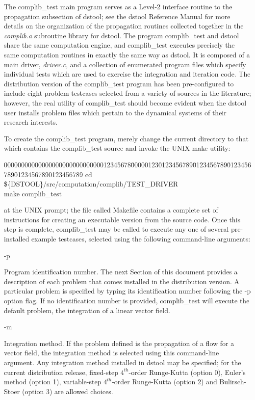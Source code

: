 \noindent The complib\_test main program serves as a Level-2 interface routine to the propagation 
subsection of dstool;  see the dstool Reference Manual \cite{ref1} for more details on the organization
of the propagation routines collected together in the {\em complib.a} subroutine library for dstool.
The program complib\_test and dstool share the same computation engine, and
complib\_test executes precisely the same computation routines in exactly the same way as dstool.
It is composed of a main driver, {\em driver.c}, and a collection
of enumerated program files which specify individual tests which are used to exercise the integration
and iteration code. 
The distribution version of the complib\_test program has been pre-configured to include
eight problem testcases selected from a variety of sources in the literature;   however,
the real utility of complib\_test should become evident when the dstool user installs problem
files which pertain to the dynamical systems of their research interests.
\medskip

\noindent To create the complib\_test program, merely change the current directory to that which contains
the complib\_test source and invoke the UNIX make utility:
\begin{tabbing}
00000000000000000000\=00000000012345678\=00000123\=0123456789\=0123456789\=0123456789\=0123456789\=0123456789 \kill
\> cd \$\{DSTOOL\}/src/computation/complib/TEST\_DRIVER \\
\> make complib\_test
\end{tabbing}
at the UNIX prompt;  the file called Makefile contains a complete set of instructions for creating an executable
version from the source code.  Once this step is complete, complib\_test may be called to execute any one of
several pre-installed example testcases, selected using the following command-line arguments:
\bigskip

\hspace{.25in}\parbox[b]{.5in}{-p}
\parbox[t]{4.6in}{
Program identification number.  The next Section of this document provides 
a description of each problem that comes installed in the distribution version.
A particular problem is specified by typing its identification number following 
the -p option flag.  If no identification number is provided, complib\_test will 
execute the default problem,  the integration of a linear vector field. 
}
\bigskip

\hspace{.25in}\parbox[b]{.5in}{-m}
\parbox[t]{4.6in}{ 
Integration method. If the problem defined is the propagation of a flow for a
vector field, the integration method is selected using this command-line 
argument.  Any integration method installed in dstool may be specified;  for the
current distribution release, fixed-step $4^{th}$-order Runge-Kutta (option 0),
Euler's method (option 1), variable-step $4^{th}$-order Runge-Kutta (option 2) 
and Bulirsch-Stoer (option 3) are allowed choices.
}
\bigskip

